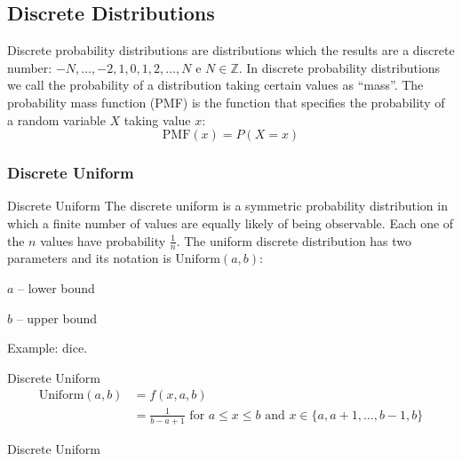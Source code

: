 \subsection*{Discrete Distributions}
\begin{frame}[noframenumbering]
	\begin{defn}
		Discrete probability distributions are distributions which the
		results are a discrete number:
		$-N, \dots, -2, 1, 0,1,2,\dots, N$ e $N \in \mathbb{Z}$.
		In discrete probability distributions we call the probability
		of a distribution taking certain values as ``mass''.
		The probability mass function (PMF) is the function that
		specifies the probability of a random variable $X$ taking value $x$:
		$$\text{PMF}(x) = P(X = x)$$
	\end{defn}
\end{frame}

\subsubsection*{Discrete Uniform}
\begin{frame}[noframenumbering]{Discrete Uniform}
	The discrete uniform is a symmetric probability distribution in which
	a finite number of values are equally likely of being observable.
	Each one of the $n$ values have probability $\frac{1}{n}$.
	\vfill
	The uniform discrete distribution has two parameters and its notation is
	$\text{Uniform}(a, b)$:
	\begin{vfilleditems}
		\item $a$ -- lower bound
		\item $b$ -- upper bound
	\end{vfilleditems}
	\vfill
	Example: dice.
\end{frame}
 
\begin{frame}[noframenumbering]{Discrete Uniform}
	$$
	\begin{aligned}
		\text{Uniform}(a,b) & = f(x, a, b) \\
		& = \frac{1}{b-a+1} \text{ for $a \leq x \leq b$ and $x\in \{a,a+1,\dots ,b-1,b\}$}
	\end{aligned}
	$$
\end{frame}

\begin{frame}[noframenumbering]{Discrete Uniform}
	\centering
\end{frame}

